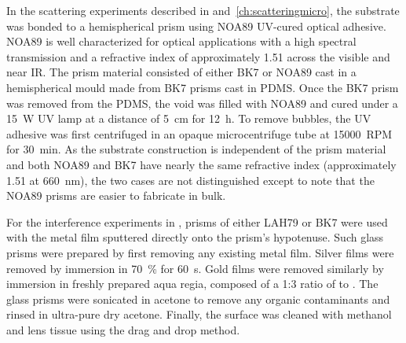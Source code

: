 In the scattering experiments described in 
and~\ref{ch:scatteringmicro}, the substrate was bonded to a hemispherical prism
using NOA89 UV-cured optical adhesive.  NOA89 is well characterized for optical
applications with a high spectral transmission and a refractive index of
approximately 1.51 across the visible and near IR\@.  The prism material
consisted of either BK7 or NOA89 cast in a hemispherical mould made from BK7
prisms cast in PDMS\@.  Once the BK7 prism was removed from the PDMS, the void
was filled with NOA89 and cured under a \SI{15}{\watt} UV lamp at a distance of
\SI{5}{\centi\meter} for \SI{12}{\hour}.  To remove bubbles, the UV adhesive
was first centrifuged in an opaque microcentrifuge tube at \SI{15000}{RPM} for
\SI{30}{\minute}.  As the substrate construction is independent of the prism
material and both NOA89 and BK7 have nearly the same refractive index
(approximately 1.51 at \SI{660}{\nano\meter}), the two cases are not
distinguished except to note that the NOA89 prisms are easier to fabricate in
bulk.

For the interference experiments in , prisms of
either LAH79 or BK7 were used with the metal film sputtered directly onto the
prism's hypotenuse.  Such glass prisms were prepared by first removing any
existing metal film.  Silver films were removed by immersion in
\SI{70}{\percent}  for \SI{60}{\second}.  Gold films were removed
similarly by immersion in freshly prepared aqua regia, composed of a 1:3 ratio
of  to .  The glass prisms were sonicated in acetone to
remove any organic contaminants and rinsed in ultra-pure dry acetone.
Finally, the surface was cleaned with methanol and lens tissue using the drag
and drop method.

